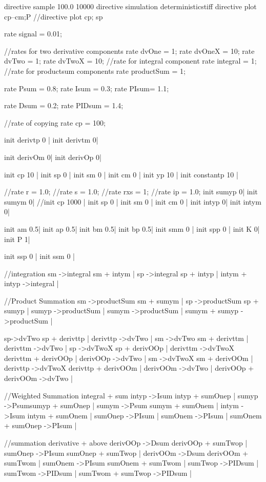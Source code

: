 directive sample 100.0 10000
directive simulation deterministicstiff
directive plot  cp--cm;P
//directive plot cp; sp

rate signal = 0.01;

//rates  for two derivative components
rate dvOne = 1;
rate dvOneX = 10;
rate dvTwo = 1;
rate dvTwoX = 10;
//rate for integral component
rate integral = 1;
//rate for productsum components
rate productSum = 1;

rate Psum = 0.8;
rate Isum = 0.3;
rate PIsum=  1.1;

rate Dsum = 0.2;
rate PIDsum = 1.4;

//rate of copying 
rate cp = 100;

init derivtp 0 |
init derivtm 0|

init derivOm 0|
init derivOp 0| 

init cp 10 |
init sp 0 |
init sm 0 |
init cm 0 |
init yp 10 |
init constantp 10 |

//rate r = 1.0;
//rate s = 1.0;
//rate rxs = 1;
//rate ip = 1.0;
init sumyp 0|
init sumym 0|
//init cp 1000 |
init sp 0 |
init sm 0 |
init cm 0 |
init intyp 0|
init intym 0|

init am 0.5|
init ap 0.5|
init bm 0.5|
init bp 0.5|
init smm 0 |
init spp 0 |
init K 0|
init P 1|

init ssp 0 |
init ssm 0 |




//integration
sm ->{integral} sm + intym |
sp ->{integral} sp + intyp |
intym + intyp ->{integral} |

//Product Summation
sm ->{productSum} sm + sumym |
sp ->{productSum} sp + sumyp |
sumyp ->{productSum} |
sumym ->{productSum} |
sumym + sumyp ->{productSum} |


sp->{dvTwo} sp + derivttp |
derivttp ->{dvTwo} |
sm ->{dvTwo} sm + derivttm |
derivttm ->{dvTwo} |
sp ->{dvTwoX} sp + derivOOp |
derivttm ->{dvTwoX} derivttm + derivOOp | 
derivOOp ->{dvTwo} | 
sm ->{dvTwoX} sm + derivOOm |
derivttp ->{dvTwoX} derivttp + derivOOm |
derivOOm ->{dvTwo} |
derivOOp + derivOOm ->{dvTwo} |

//Weighted Summation integral + sum
intyp ->{Isum} intyp + sumOnep |
sumyp ->{Psum}sumyp + sumOnep |
sumym ->{Psum} sumym + sumOnem |
intym ->{Isum} intym + sumOnem |
sumOnep ->{PIsum} |
sumOnem ->{PIsum} |
sumOnem + sumOnep ->{PIsum} |

//summation derivative + above 
derivOOp ->{Dsum} derivOOp + sumTwop |
sumOnep ->{PIsum} sumOnep + sumTwop |
derivOOm ->{Dsum} derivOOm + sumTwom |
sumOnem ->{PIsum} sumOnem + sumTwom |
sumTwop ->{PIDsum} |
sumTwom ->{PIDsum} |
sumTwom + sumTwop ->{PIDsum} |

